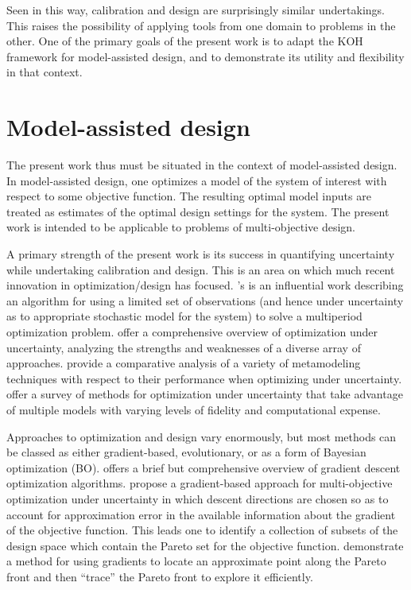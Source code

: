 \documentclass[10pt,a4paper]{article}
\begin{document}
Seen in this way, calibration and design are surprisingly similar undertakings. 
This raises the possibility of applying tools from one domain to problems in the other.
One of the primary goals of the present work is to adapt the KOH framework for model-assisted design, and to demonstrate its utility and flexibility in that context.


\section{Model-assisted design}

The present work thus must be situated in the context of model-assisted design.
In model-assisted design, one optimizes a model of the system of interest with respect to some objective function.
The resulting optimal model inputs are treated as estimates of the optimal design settings for the system.
The present work is intended to be applicable to problems of multi-objective design.

A primary strength of the present work is its success in quantifying uncertainty while undertaking calibration and design.
This is an area on which much recent innovation in optimization/design has focused.
\citeauthor{Rockafellar1991}'s \citeyearpar{Rockafellar1991} is an influential work describing an algorithm for using a limited set of observations (and hence under uncertainty as to appropriate stochastic model for the system) to solve a multiperiod optimization problem.
\citet{Sahinidis2004} offer a comprehensive overview of optimization under uncertainty, analyzing the strengths and weaknesses of a diverse array of approaches.
\citet{Jin2003} provide a comparative analysis of a variety of metamodeling techniques with respect to their performance when optimizing under uncertainty.
\citet{Peherstorfer2018} offer a survey of methods for optimization under uncertainty that take advantage of multiple models with varying levels of fidelity and computational expense.

Approaches to optimization and design vary enormously, but most methods can be classed as either gradient-based, evolutionary, or as a form of Bayesian optimization (BO).
\citet{Ruder2016} offers a brief but comprehensive overview of gradient descent optimization algorithms.
\citet{Peitz2018} propose a gradient-based approach for multi-objective optimization under uncertainty in which descent directions are chosen so as to account for approximation error in the available information about the gradient of the objective function.
This leads one to identify a collection of subsets of the design space which contain the Pareto set for the objective function.
\citet{Vasilopoulos2019} demonstrate a method for using gradients to locate an approximate point along the Pareto front and then ``trace'' the Pareto front to explore it efficiently.
\end{document}
